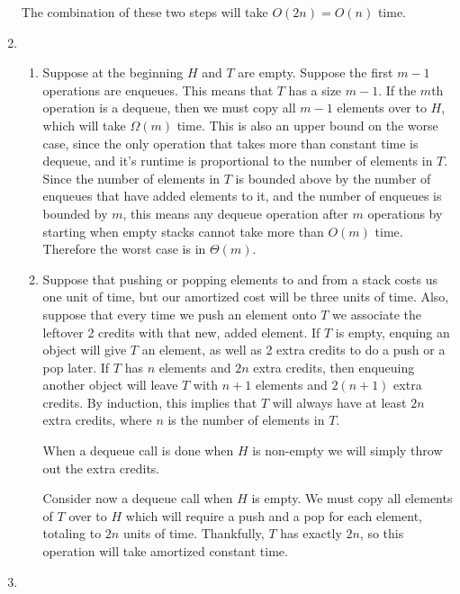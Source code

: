 \documentclass[letterpaper,10pt]{article}
\begin{document}
\begin{enumerate}
  The combination of these two steps will take $O(2n) = O(n)$ time.

  \clearpage
  \item

  \begin{enumerate}
    \item Suppose at the beginning $H$ and $T$ are empty. Suppose the first $m-1$ operations are enqueues. This means that $T$ has a size $m-1$. If the $m$th operation is a dequeue, then we must copy all $m-1$ elements over to $H$, which will take $\Omega(m)$ time. This is also an upper bound on the worse case, since the only operation that takes more than constant time is dequeue, and it's runtime is proportional to the number of elements in $T$. Since the number of elements in $T$ is bounded above by the number of enqueues that have added elements to it, and the number of enqueues is bounded by $m$, this means any dequeue operation after $m$ operations by starting when empty stacks cannot take more than $O(m)$ time. Therefore the worst case is in $\Theta(m)$.
    \item Suppose that pushing or popping elements to and from a stack costs us one unit of time, but our amortized cost will be three units of time. Also, suppose that every time we push an element onto $T$ we associate the leftover 2 credits with that new, added element. If $T$ is empty, enquing an object will give $T$ an element, as well as 2 extra credits to do a push or a pop later. If $T$ has $n$ elements and $2n$ extra credits, then enqueuing another object will leave $T$ with $n+1$ elements and $2(n+1)$ extra credits. By induction, this implies that $T$ will always have at least $2n$ extra credits, where $n$ is the number of elements in $T$.
    
    When a dequeue call is done when $H$ is non-empty we will simply throw out the extra credits.
    
    Consider now a dequeue call when $H$ is empty. We must copy all elements of $T$ over to $H$ which will require a push and a pop for each element, totaling to $2n$ units of time. Thankfully, $T$ has exactly $2n$, so this operation will take amortized constant time. 
  \end{enumerate}

  \clearpage
  \item


\end{enumerate}
\end{document}
